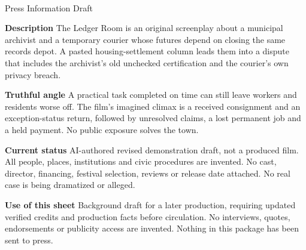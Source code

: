 \documentclass[11pt,letterpaper]{article}
\begin{document}
\begin{center}
{\Large\bfseries\sffamily \filmtitleupper}\\[6pt]
Press Information Draft
\end{center}
\textbf{Description} The Ledger Room is an original screenplay about a municipal archivist and a temporary courier whose futures depend on closing the same records depot. A pasted housing-settlement column leads them into a dispute that includes the archivist's old unchecked certification and the courier's own privacy breach.

\textbf{Truthful angle} A practical task completed on time can still leave workers and residents worse off. The film's imagined climax is a received consignment and an exception-status return, followed by unresolved claims, a lost permanent job and a held payment. No public exposure solves the town.

\textbf{Current status} AI-authored revised demonstration draft, not a produced film. All people, places, institutions and civic procedures are invented. No cast, director, financing, festival selection, reviews or release date attached. No real case is being dramatized or alleged.

\textbf{Use of this sheet} Background draft for a later production, requiring updated verified credits and production facts before circulation. No interviews, quotes, endorsements or publicity access are invented. Nothing in this package has been sent to press.
\end{document}
